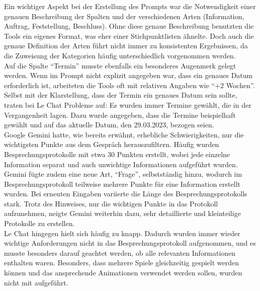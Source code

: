Ein wichtiger Aspekt bei der Erstellung des Prompts war die Notwendigkeit einer genauen Beschreibung der Spalten und der verschiedenen 
Arten (Information, Auftrag, Feststellung, Beschluss). Ohne diese genaue Beschreibung benutzten die Tools ein eigenes Format, was eher  
einer Stichpunktlisten ähnelte. Doch auch die genaue Definition der Arten führt nicht immer zu konsistenten Ergebnissen, da die Zuweisung 
der Kategorien häufig unterschiedlich vorgenommen werden.\\

Auf die Spalte ``Termin'' musste ebenfalls ein besonderes Augenmerk gelegt werden. Wenn im Prompt nicht explizit angegeben war, dass ein 
genaues Datum erforderlich ist, arbeiteten die Tools oft mit relativen Angaben wie ``+2 Wochen''. Selbst mit der Klarstellung, dass der 
Termin ein genaues Datum sein sollte, traten bei Le Chat Probleme auf: Es wurden immer Termine gewählt, die in der Vergangenheit lagen. 
Dazu wurde angegeben, dass die Termine beispielhaft gewählt und auf das aktuelle Datum, den 29.03.2023, bezogen seien.\\

Google Gemini hatte, wie bereits erwähnt, erhebliche Schwierigkeiten, nur die wichtigsten Punkte aus dem Gespräch herauszufiltern. 
Häufig wurden Besprechungsprotokolle mit etwa 30 Punkten erstellt, wobei jede einzelne Information separat und auch unwichtige 
Informationen aufgeführt wurden. Gemini fügte zudem eine neue Art, ``Frage'', selbstständig hinzu, wodurch im Besprechungsprotokoll 
teilweise mehrere Punkte für eine Information erstellt wurden. Bei erneuten Eingaben variierte die Länge des Besprechungsprotokolls 
stark. Trotz des Hinweises, nur die wichtigen Punkte in das Protokoll aufzunehmen, neigte Gemini weiterhin dazu, sehr detaillierte und 
kleinteilige Protokolle zu erstellen.\\

Le Chat hingegen hielt sich häufig zu knapp. Dadurch wurden immer wieder wichtige Anforderungen nicht in das Besprechungsprotokoll 
aufgenommen, und es musste besonders darauf geachtet werden, ob alle relevanten Informationen enthalten waren. Besonders, dass mehrere
Spiele gleichzeitig gespielt werden können und das ansprechende Animationen verwendet werden sollen, wurden nicht mit aufgeführt.\\


